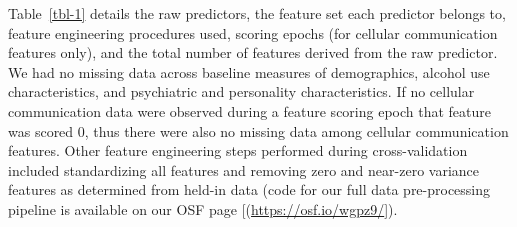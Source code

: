 \documentclass[
  letterpaper,
  DIV=11,
  numbers=noendperiod]{scrartcl}
\begin{document}
Table~\ref{tbl-1} details the raw predictors, the feature set each
predictor belongs to, feature engineering procedures used, scoring
epochs (for cellular communication features only), and the total number
of features derived from the raw predictor. We had no missing data
across baseline measures of demographics, alcohol use characteristics,
and psychiatric and personality characteristics. If no cellular
communication data were observed during a feature scoring epoch that
feature was scored 0, thus there were also no missing data among
cellular communication features. Other feature engineering steps
performed during cross-validation included standardizing all features
and removing zero and near-zero variance features as determined from
held-in data (code for our full data pre-processing pipeline is
available on our OSF page {[}(\url{https://osf.io/wgpz9/}{]}).
\end{document}
